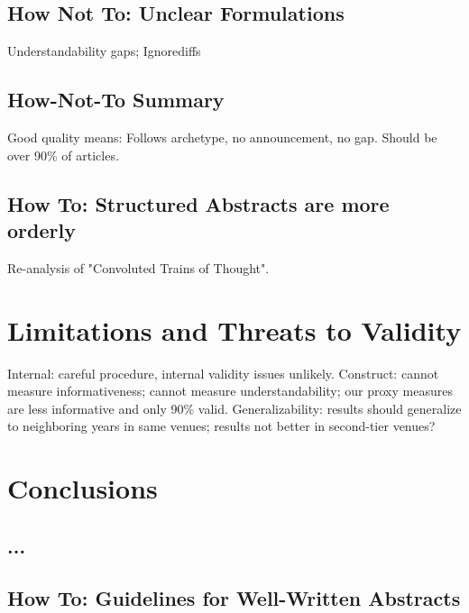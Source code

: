 \documentclass[10pt,journal,compsoc]{IEEEtran}
\begin{document}
\subsection{How Not To: Unclear Formulations}

\noindent
Understandability gaps; Ignorediffs


\subsection{How-Not-To Summary}

\noindent
Good quality means: Follows archetype, no announcement, no gap.
Should be over 90\% of articles.


\subsection{How To: Structured Abstracts are more orderly}

\noindent
Re-analysis of "Convoluted Trains of Thought". 




\section{Limitations and Threats to Validity}

\noindent
Internal: careful procedure, internal validity issues unlikely.
Construct: cannot measure informativeness; cannot measure understandability;
our proxy measures are less informative and only 90\% valid.
Generalizability: 
results should generalize to neighboring years in same venues;
results not better in second-tier venues?


\section{Conclusions}


\subsection{...}
\noindent


\subsection{How To: Guidelines for Well-Written Abstracts}
\end{document}
